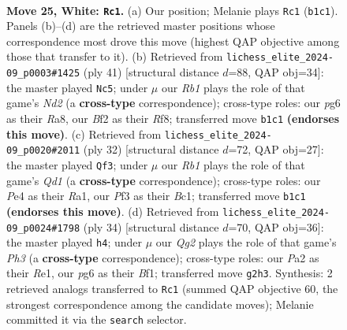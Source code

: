 \documentclass[11pt]{article}
\begin{document}
\clearpage

\begin{figure}[p]\centering
\begin{subfigure}{0.46\textwidth}\centering
\resizebox{\linewidth}{!}{%
\newchessgame
\chessboard[
  setfen={r6r/1q1b1kbp/p1npp1p1/1p2p1Pn/4P2P/2N2P2/PPPK1BQ1/RR3B2 w - - 1 25},
  showmover=false,
  pgfstyle=straightmove, color=movearrow, markmove={b1-c1}
]}
\caption{}
\end{subfigure}\hfill
\begin{subfigure}{0.46\textwidth}\centering
\resizebox{\linewidth}{!}{%
\newchessgame
\chessboard[
  setfen={r4rk1/1pqnbpp1/p1b1p2p/P3p3/2N1P3/2PBB3/1P2QPPP/R2R2K1 b - - 0 21},
  showmover=false,
  pgfstyle=straightmove, color=movearrow, markmove={d7-c5}
]}
\caption{}
\end{subfigure}
\\[4pt]
\begin{subfigure}{0.46\textwidth}\centering
\resizebox{\linewidth}{!}{%
\newchessgame
\chessboard[
  setfen={2bqnrk1/4bppp/r7/p2pP3/1ppP1N2/8/PPB2PPP/R1BQR1K1 w - - 2 17},
  showmover=false,
  pgfstyle=straightmove, color=movearrow, markmove={d1-f3}
]}
\caption{}
\end{subfigure}\hfill
\begin{subfigure}{0.46\textwidth}\centering
\resizebox{\linewidth}{!}{%
\newchessgame
\chessboard[
  setfen={r2q1rnk/2p1npbp/3p2p1/pPpPp3/P3P3/5N1P/5PP1/R1BQRBK1 w - - 1 18},
  showmover=false,
  pgfstyle=straightmove, color=movearrow, markmove={h3-h4}
]}
\caption{}
\end{subfigure}
\caption{\textbf{Move 25, White: \texttt{Rc1}.} (a) Our position; Melanie plays \texttt{Rc1} (\texttt{b1c1}). Panels (b)--(d) are the retrieved master positions whose correspondence most drove this move (highest QAP objective among those that transfer to it). (b) Retrieved from \texttt{lichess\_elite\_2024-09\_p0003\#1425} (ply 41) [structural distance $d$=88, QAP obj=34]: the master played \texttt{Nc5}; under $\mu$ our \emph{Rb1} plays the role of that game's \emph{Nd2} (a \textbf{cross-type} correspondence); cross-type roles: our \emph{p}g6 as their \emph{R}a8, our \emph{B}f2 as their \emph{R}f8; transferred move \texttt{b1c1} \textbf{(endorses this move)}. (c) Retrieved from \texttt{lichess\_elite\_2024-09\_p0020\#2011} (ply 32) [structural distance $d$=72, QAP obj=27]: the master played \texttt{Qf3}; under $\mu$ our \emph{Rb1} plays the role of that game's \emph{Qd1} (a \textbf{cross-type} correspondence); cross-type roles: our \emph{P}e4 as their \emph{R}a1, our \emph{P}f3 as their \emph{B}c1; transferred move \texttt{b1c1} \textbf{(endorses this move)}. (d) Retrieved from \texttt{lichess\_elite\_2024-09\_p0024\#1798} (ply 34) [structural distance $d$=70, QAP obj=36]: the master played \texttt{h4}; under $\mu$ our \emph{Qg2} plays the role of that game's \emph{Ph3} (a \textbf{cross-type} correspondence); cross-type roles: our \emph{P}a2 as their \emph{R}e1, our \emph{p}g6 as their \emph{B}f1; transferred move \texttt{g2h3}. Synthesis: 2 retrieved analogs transferred to \texttt{Rc1} (summed QAP objective 60, the strongest correspondence among the candidate moves); Melanie committed it via the \texttt{search} selector.}

\end{figure}
\end{document}
